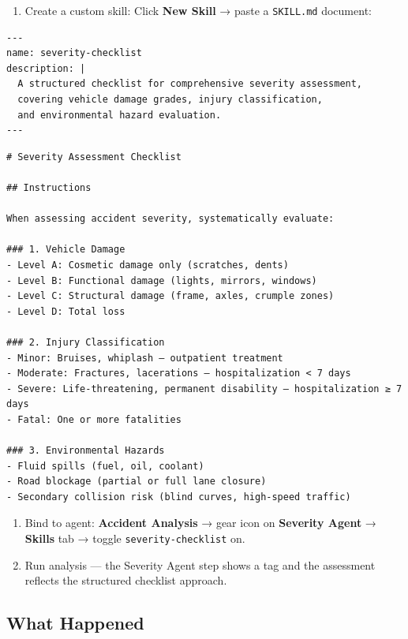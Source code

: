 \documentclass[
  paper=a4,
  fontsize=10pt,
  DIV=14,
  headings=normal,
  headsepline=true,
  parskip=half,
]{scrartcl}
\newcommand{\code}[1]{\lstinline[basicstyle=\ttfamily\small,breaklines=false]|#1|}
\newcommand{\eltagwarning}[1]{\tcbox[on line,size=small,colback=black!10,colframe=black!50,boxrule=0.5pt,arc=2pt,left=3pt,right=3pt,top=0.5pt,bottom=0.5pt]{\small #1}}
\begin{document}
\begin{enumerate}[resume]
  \item Create a custom skill: Click \textbf{New Skill} → paste a \code{SKILL.md} document:
\end{enumerate}

\begin{verbatim}
---
name: severity-checklist
description: |
  A structured checklist for comprehensive severity assessment,
  covering vehicle damage grades, injury classification,
  and environmental hazard evaluation.
---
\end{verbatim}

\begin{verbatim}
# Severity Assessment Checklist

## Instructions

When assessing accident severity, systematically evaluate:

### 1. Vehicle Damage
- Level A: Cosmetic damage only (scratches, dents)
- Level B: Functional damage (lights, mirrors, windows)
- Level C: Structural damage (frame, axles, crumple zones)
- Level D: Total loss

### 2. Injury Classification
- Minor: Bruises, whiplash — outpatient treatment
- Moderate: Fractures, lacerations — hospitalization < 7 days
- Severe: Life-threatening, permanent disability — hospitalization ≥ 7 days
- Fatal: One or more fatalities

### 3. Environmental Hazards
- Fluid spills (fuel, oil, coolant)
- Road blockage (partial or full lane closure)
- Secondary collision risk (blind curves, high-speed traffic)
\end{verbatim}

\begin{enumerate}[resume]
  \item Bind to agent: \textbf{Accident Analysis} → gear icon on \textbf{Severity Agent} → \textbf{Skills} tab → toggle \code{severity-checklist} on.
  \item Run analysis — the Severity Agent step shows a \eltagwarning{severity-checklist} tag and the assessment reflects the structured checklist approach.
\end{enumerate}

\subsection{What Happened}
\end{document}
